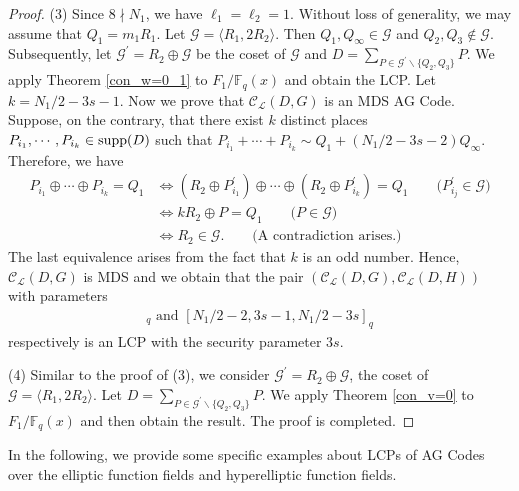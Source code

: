 \documentclass[journal,12pt,onecolumn]{IEEEtran}
\begin{document}
\begin{proof}
    (3) Since $8\nmid N_1$, we have $\ell_1=\ell_2=1$. Without loss of generality, we may assume that $Q_1 = m_1 R_1$. Let $\mathcal{G} = \langle R_1, 2R_2\rangle$. Then  $Q_1,Q_\infty\in \mathcal{G}$ and $Q_2,Q_3\notin \mathcal{G}$. Subsequently, let $\mathcal{G}^\prime = R_2 \oplus \mathcal{G}$ be the coset of $\mathcal{G}$ and $D = \sum_{P\in \mathcal{G}^\prime\backslash\{Q_2,Q_3\}} P$. We apply Theorem \ref{con_w=0_1} to $F_1/\mathbb{F}_q(x)$ and obtain the LCP. Let $k = N_1/2-3s-1$. Now we prove that $\mathcal{C}_{\mathcal{L}}(D,G)$ is an MDS AG Code. Suppose, on the contrary, that there exist $k$ distinct places $P_{i_1},\cdots,P_{i_k}\in{\rm supp}(D)$ such that $P_{i_1}+\cdots+ P_{i_k} \sim Q_1 + (N_1/2-3s-2)Q_\infty$. Therefore, we have
    \begin{align*}
        P_{i_1}\oplus\cdots\oplus P_{i_k} = Q_1 &\Longleftrightarrow (R_2 \oplus P_{i_1}^\prime) \oplus\cdots\oplus (R_2 \oplus P_{i_k}^\prime) = Q_1 \qquad \big( P_{i_j}^\prime\in \mathcal{G} \big)\\
        & \Longleftrightarrow k R_2 \oplus P = Q_1 \qquad \big( P\in \mathcal{G} \big) \\
        & \Longleftrightarrow R_2 \in \mathcal{G}. \qquad\big( \text{A contradiction arises.} \big)
    \end{align*}
    The last equivalence arises from the fact that $k$ is an odd number. Hence, $\mathcal{C}_{\mathcal{L}}(D,G)$ is MDS and we obtain that the pair $(\mathcal{C}_{\mathcal{L}}(D,G),\mathcal{C}_{\mathcal{L}}(D,H))$ with parameters
    \begin{gather*}
        [N_1/2-2,N_1/2-3s-1,3s]_q\text{ and }[N_1/2-2,3s-1,N_1/2-3s]_q
    \end{gather*}
    respectively is an LCP with the security parameter $3s$. 

    (4) Similar to the proof of (3), we consider $\mathcal{G}^\prime = R_2 \oplus \mathcal{G}$, the coset of $\mathcal{G}= \langle R_1, 2R_2\rangle$. Let $D = \sum_{P\in \mathcal{G}^\prime\backslash\{Q_2,Q_3\}} P$. We apply Theorem \ref{con_v=0} to $F_1/\mathbb{F}_q(x)$ and then obtain the result. The proof is completed. 
\end{proof}


In the following, we provide some specific examples about LCPs of AG Codes over the elliptic function fields and hyperelliptic function fields.
\end{document}
